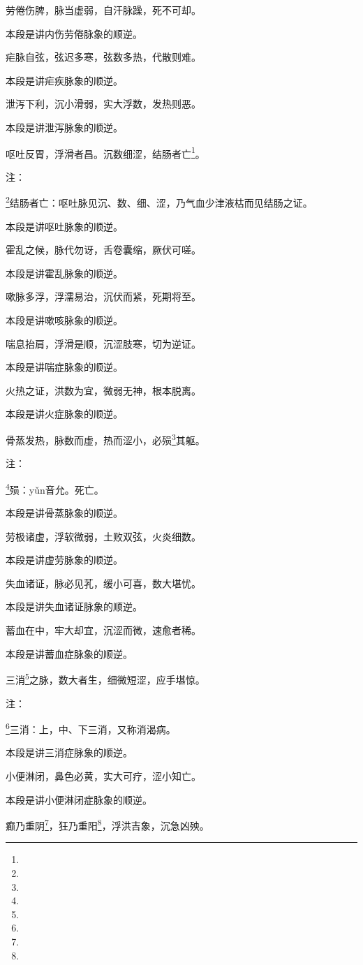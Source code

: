 \documentclass[a4paper,12pt,UTF8,twoside]{ctexbook}
\begin{document}
劳倦伤脾，脉当虚弱，自汗脉躁，死不可却。

本段是讲内伤劳倦脉象的顺逆。

疟脉自弦，弦迟多寒，弦数多热，代散则难。

本段是讲疟疾脉象的顺逆。

泄泻下利，沉小滑弱，实大浮数，发热则恶。

本段是讲泄泻脉象的顺逆。

呕吐反胃，浮滑者昌。沉数细涩，结肠者亡\footnote{}。

注：

\footnote{}结肠者亡：呕吐脉见沉、数、细、涩，乃气血少津液枯而见结肠之证。

本段是讲呕吐脉象的顺逆。

霍乱之候，脉代勿讶，舌卷囊缩，厥伏可嗟。

本段是讲霍乱脉象的顺逆。

嗽脉多浮，浮濡易治，沉伏而紧，死期将至。

本段是讲嗽咳脉象的顺逆。

喘息抬肩，浮滑是顺，沉涩肢寒，切为逆证。

本段是讲喘症脉象的顺逆。

火热之证，洪数为宜，微弱无神，根本脱离。

本段是讲火症脉象的顺逆。

骨蒸发热，脉数而虚，热而涩小，必殒\footnote{}其躯。

注：

\footnote{}殒：yǔn音允。死亡。

本段是讲骨蒸脉象的顺逆。

劳极诸虚，浮软微弱，土败双弦，火炎细数。

本段是讲虚劳脉象的顺逆。

失血诸证，脉必见芤，缓小可喜，数大堪忧。

本段是讲失血诸证脉象的顺逆。

蓄血在中，牢大却宜，沉涩而微，速愈者稀。

本段是讲蓄血症脉象的顺逆。

三消\footnote{}之脉，数大者生，细微短涩，应手堪惊。

注：

\footnote{}三消：上，中、下三消，又称消渴病。

本段是讲三消症脉象的顺逆。

小便淋闭，鼻色必黄，实大可疗，涩小知亡。

本段是讲小便淋闭症脉象的顺逆。

癫乃重阴\footnote{}，狂乃重阳\footnote{}，浮洪吉象，沉急凶殃。
\end{document}
